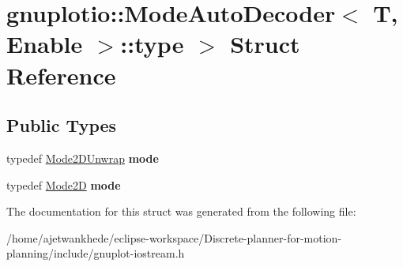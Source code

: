 \hypertarget{structgnuplotio_1_1ModeAutoDecoder_1_1type_01_4}{}\section{gnuplotio\+:\+:Mode\+Auto\+Decoder$<$ T, Enable $>$\+:\+:type $>$ Struct Reference}
\label{structgnuplotio_1_1ModeAutoDecoder_1_1type_01_4}
\subsection*{Public Types}
\begin{DoxyCompactItemize}
\item 
\mbox{\label{structgnuplotio_1_1ModeAutoDecoder_1_1type_01_4_ad1942745c810b24503495c6ade6bd9f6}} 
typedef \mbox{\hyperlink{structgnuplotio_1_1Mode2DUnwrap}{Mode2\+D\+Unwrap}} {\bfseries mode}
\item 
\mbox{\label{structgnuplotio_1_1ModeAutoDecoder_1_1type_01_4_a07e8af1d93e8107efb7be6fd68b0024c}} 
typedef \mbox{\hyperlink{structgnuplotio_1_1Mode2D}{Mode2D}} {\bfseries mode}
\end{DoxyCompactItemize}


The documentation for this struct was generated from the following file\+:\begin{DoxyCompactItemize}
\item 
/home/ajetwankhede/eclipse-\/workspace/\+Discrete-\/planner-\/for-\/motion-\/planning/include/gnuplot-\/iostream.\+h\end{DoxyCompactItemize}

